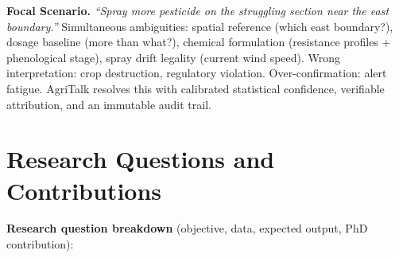 \documentclass[11pt,a4paper]{article}
\begin{document}
\begin{scenariobox}
\small\textbf{Focal Scenario.}
\emph{``Spray more pesticide on the struggling section near the east boundary.''}
Simultaneous ambiguities: spatial reference (which east boundary?), dosage baseline (more than what?), chemical formulation (resistance profiles + phenological stage), spray drift legality (current wind speed). Wrong interpretation: crop destruction, regulatory violation. Over-confirmation: alert fatigue. AgriTalk resolves this with calibrated statistical confidence, verifiable attribution, and an immutable audit trail.
\end{scenariobox}

\section{Research Questions and Contributions}

\noindent\textbf{Research question breakdown} (objective, data, expected output, PhD contribution):
\end{document}
